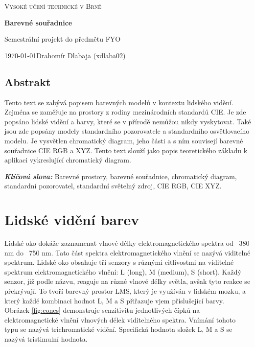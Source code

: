 \documentclass[a4paper, 12pt, titlepage]{article}
\begin{document}
  \begin{titlepage}
      \begin{center}
        \Huge\textsc{Vysoké učení technické v Brně}\\

          \Huge
          \textbf{Barevné souřadnice}

          \vspace{0.5cm}
          \LARGE
          Semestrální projekt do předmětu FYO


          {\Large \today \hfill Drahomír Dlabaja  (xdlaba02)}

      \end{center}
  \end{titlepage}

  \begin{center}
    \section*{Abstrakt}
  \end{center}
  Tento text se zabývá popisem barevných modelů v kontextu lidského vidění.
  Zejména se zaměřuje na prostory z rodiny mezinárodních standardů CIE.
  Je zde popsáno lidské vidění a barvy, které se v přírodě nemůžou nikdy vyskytovat.
  Také jsou zde popsány modely standardního pozorovatele a standardního osvětlovacího modelu.
  Je vysvětlen chromatický diagram, jeho části a s ním souvisejí barevné souřadnice CIE RGB a XYZ.
  Tento text slouží jako popis teoretického základu k aplikaci vykreslující chromatický diagram.

  \vfill

  \textit{\textbf{Klíčová slova:}} Barevné prostory, barevné souřadnice, chromatický diagram, standardní pozorovatel, standardní světelný zdroj, CIE RGB, CIE XYZ.

  \newpage

  \section{Lidské vidění barev}
  Lidské oko dokáže zaznamenat vlnové délky elektromagnetického spektra od ~380 nm do ~750 nm.
  Tato část spektra elektromagnetického vlnění se nazývá viditelné spektrum.
  Lidské oko obsahuje tři senzory s různými citlivostmi na viditelné spektrum elektromagnetického vlnění: L (long), M (medium), S (short).
  Každý senzor, již podle názvu, reaguje na různé vlnové délky světla, avšak tyto reakce se překrývají.
  To tvoří barevný prostor LMS, který je využíván v lidském mozku, a který každé kombinaci hodnot L, M a S přiřazuje vjem příslušející barvy.
  Obrázek \ref{fig:cones} demonstruje senzitivitu jednotlivých čípků na elektromagnetické vlnění vlnových délek viditelného spektra.
  Vnímání tohoto typu se nazývá trichromatické vidění.
  Specifická hodnota složek L, M a S se nazývá tristimulní hodnota. \cite{Abraham2016, ciexyz}
\end{document}

